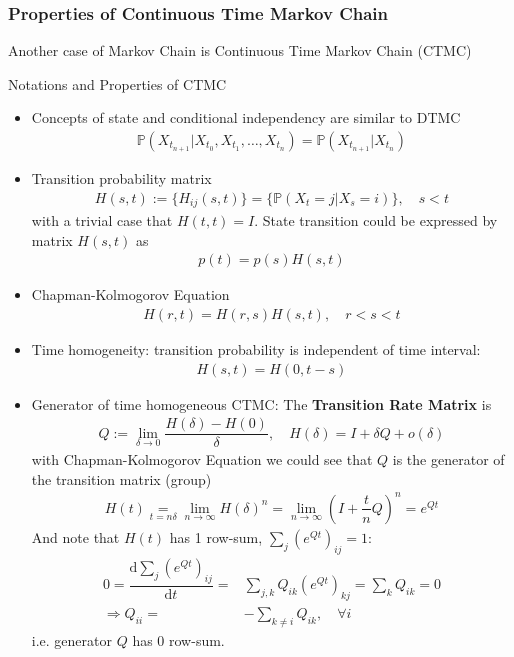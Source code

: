 \subsubsection{Properties of Continuous Time Markov Chain}\label{SubSubSectionCTMC}
Another case of Markov Chain is Continuous Time Markov Chain (CTMC)

\begin{point}
    Notations and Properties of CTMC
\end{point}
\begin{itemize}[topsep=2pt,itemsep=0pt]
    \item Concepts of state and conditional independency are similar to DTMC
    \begin{align*}
         \mathbb{P}\left( X_{t_{n+1}}\big|X_{t_0},X_{t_1},\ldots,X_{t_{n}} \right)=\mathbb{P}\left( X_{t_{n+1}}\big| X_{t_n} \right)  
    \end{align*}
    \item Transition probability matrix
    \begin{align*}
         H(s,t):=\{H_{ij}(s,t)\}=\{\mathbb{P}\left( X_{t}=j|X_{s}=i \right) \},\quad s<t
    \end{align*}
    with a trivial case that $ H(t,t)=I $. State transition could be expressed by matrix $ H(s,t) $ as
    \begin{align*}
        p(t)=p(s)H(s,t)
    \end{align*}
    
    \item Chapman-Kolmogorov Equation
    \begin{align*}
        H(r,t)=H(r,s)H(s,t),\quad r<s<t 
    \end{align*}
    \item Time homogeneity: transition probability is independent of time interval:
    \begin{align*}
        H(s,t)=H(0,t-s) 
    \end{align*}
    \item Generator of time homogeneous CTMC: The \textbf{Transition Rate Matrix} is 
    \begin{align*}
        Q:=\lim_{\delta \to 0}\dfrac{H(\delta )-H(0)}{\delta },\quad H(\delta )=I+\delta Q+o(\delta ) 
    \end{align*}
    with Chapman-Kolmogorov Equation we could see that $ Q $ is the generator of the transition matrix (group)
    \begin{align*}
        H(t)\mathop{=}\limits_{t=n\delta }\lim_{n\to\infty}H(\delta )^n=\lim_{n\to\infty}\left(I+\dfrac{t}{n}Q\right)^{n}=e^{Qt}  
    \end{align*}
    And note that $ H(t) $ has 1 row-sum, $ \sum_{j}\left(e^{Qt}\right)_{ij}=1 $:
    \begin{align*}
        0=\dfrac{\mathrm{d}\sum_{j}\left(e^{Qt}\right)_{ij}}{\mathrm{d}t^{}}=&\sum_{j,k}Q_{ik} \left(e^{Qt}\right)_{kj}=\sum_{k}Q_{ik}=0\\
        \Rightarrow Q_{ii}=&-\sum_{k\neq i}Q_{ik},\quad \forall i
    \end{align*}
    i.e. generator $ Q $ has 0 row-sum.


\end{itemize}
